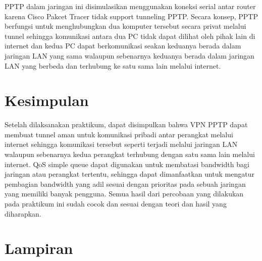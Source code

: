 PPTP dalam jaringan ini disimulasikan menggunakan koneksi serial antar router karena Cisco Pakcet Tracer tidak support tunneling PPTP. Secara konsep, PPTP berfungsi untuk menghubungkan dua komputer tersebut secara privat melalui tunnel sehingga komunikasi antara dua PC tidak dapat dilihat oleh pihak lain di internet dan kedua PC dapat berkomunikasi seakan keduanya berada dalam jaringan LAN yang sama walaupun sebenarnya keduanya berada dalam jaringan LAN yang berbeda dan terhubung ke satu sama lain melalui internet.

\section{Kesimpulan}
Setelah dilaksanakan praktikum, dapat disimpulkan bahwa VPN PPTP dapat membuat tunnel aman untuk komunikasi pribadi antar perangkat melalui internet sehingga komunikasi tersebut seperti terjadi melalui jaringan LAN walaupun sebenarnya kedua perangkat terhubung dengan satu sama lain melalui internet. QoS simple queue dapat digunakan untuk membatasi bandwidth bagi jaringan atau perangkat tertentu, sehingga dapat dimanfaatkan untuk mengatur pembagian bandwidth yang adil sesuai dengan prioritas pada sebuah jaringan yang memiliki banyak pengguna. Semua hasil dari percobaan yang dilakukan pada praktikum ini sudah cocok dan sesuai dengan teori dan hasil yang diharapkan.

\section{Lampiran}

